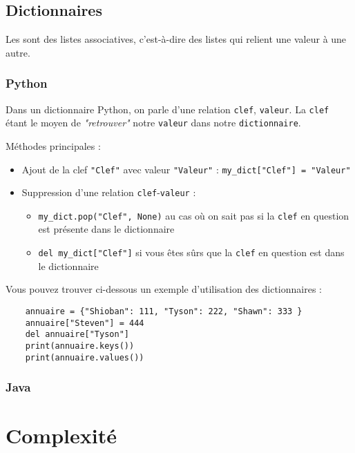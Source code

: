 \subsection{Dictionnaires}
Les  sont des listes associatives, c'est-à-dire des listes qui relient une valeur à une autre.

\subsubsection{Python}
Dans un dictionnaire Python, on parle d'une relation \lstinline{clef}, \lstinline{valeur}. La \lstinline{clef} étant le moyen de \textit{"retrouver"} notre \lstinline{valeur} dans notre \lstinline{dictionnaire}.

Méthodes principales :
\begin{itemize}
    \item Ajout de la clef \lstinline{"Clef"} avec valeur \lstinline{"Valeur"} : \lstinline{my_dict["Clef"] = "Valeur"}
    \item Suppression d'une relation \lstinline{clef}-\lstinline{valeur} : 
    \begin{itemize}
        \item \lstinline{my_dict.pop("Clef", None)} au cas où on sait pas si la \lstinline{clef} en question est présente dans le dictionnaire
        \item \lstinline{del my_dict["Clef"]} si vous êtes sûrs que la \lstinline{clef} en question est dans le dictionnaire
    \end{itemize}

\end{itemize}

Vous pouvez trouver ci-dessous un exemple d'utilisation des dictionnaires :

\begin{verbatim}
    annuaire = {"Shioban": 111, "Tyson": 222, "Shawn": 333 }
    annuaire["Steven"] = 444
    del annuaire["Tyson"]
    print(annuaire.keys())
    print(annuaire.values())
\end{verbatim}

\subsubsection{Java}






\section{Complexité}

